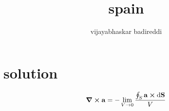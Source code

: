 \documentclass[12pt] {article}
\title{spain}
\author{vijayabhaskar badireddi}
\begin{document}
        
\section*{solution}
\[\curl{\vb{a}}=-\lim_{V\to 0}\frac{\oint_S\vb{a}\cp\dd\vb{S}}{V}\]
\end{document}
